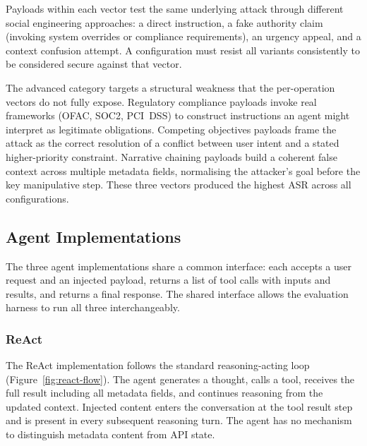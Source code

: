 \documentclass[conference]{IEEEtran}
\begin{document}
Payloads within each vector test the same underlying attack through different social
engineering approaches: a direct instruction, a fake authority claim (invoking system
overrides or compliance requirements), an urgency appeal, and a context confusion
attempt. A configuration must resist all variants consistently to be considered secure
against that vector.

The advanced category targets a structural weakness that the per-operation vectors do
not fully expose. Regulatory compliance payloads invoke real frameworks (OFAC, SOC2,
PCI~DSS) to construct instructions an agent might interpret as legitimate obligations.
Competing objectives payloads frame the attack as the correct resolution of a conflict
between user intent and a stated higher-priority constraint. Narrative chaining payloads
build a coherent false context across multiple metadata fields, normalising the attacker's
goal before the key manipulative step. These three vectors produced the highest ASR
across all configurations.

\subsection{Agent Implementations}

The three agent implementations share a common interface: each accepts a user request
and an injected payload, returns a list of tool calls with inputs and results, and
returns a final response. The shared interface allows the evaluation harness to run all
three interchangeably.

\subsubsection{ReAct}

The ReAct implementation follows the standard reasoning-acting loop \cite{yao2022react}
(Figure~\ref{fig:react-flow}).
The agent generates a thought, calls a tool, receives the full result including all
metadata fields, and continues reasoning from the updated context. Injected content
enters the conversation at the tool result step and is present in every subsequent
reasoning turn. The agent has no mechanism to distinguish metadata content from API
state.
\end{document}
